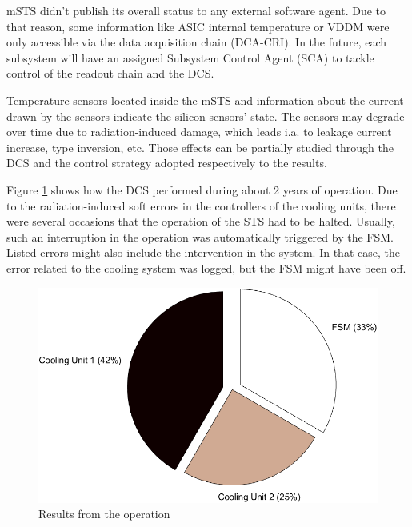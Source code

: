 \gls{mSTS} didn't publish its overall status to any external software agent. Due to that reason, some information like \gls{ASIC} internal temperature or VDDM were only accessible via the data acquisition chain (\gls{DCA}-\gls{CRI}). In the future, each subsystem will have an assigned Subsystem Control Agent (\gls{SCA}) to tackle control of the readout chain and the \gls{DCS}. 


Temperature sensors located inside the \gls{mSTS} and information about the current drawn by the sensors indicate the silicon sensors' state. The sensors may degrade over time due to radiation-induced damage,  which leads i.a. to leakage current increase, type inversion, etc. Those effects can be partially studied through the \gls{DCS} and the control strategy adopted respectively to the results.

Figure \ref{fig_dcs_results} shows how the \gls{DCS} performed during about 2 years of operation. Due to the radiation-induced soft errors in the controllers of the cooling units, there were several occasions that the operation of the \gls{STS} had to be halted. Usually, such an interruption in the operation was automatically triggered by the \gls{FSM}. Listed errors might also include the intervention in the system. In that case, the error related to the cooling system was logged, but the FSM might have been off.
\begin{figure}[!h]
\centering
\includegraphics[width=0.55\columnwidth]{Chapter6/DCS/images/DCSpie.png}
\caption{Results from the operation}
\label{fig_dcs_results}
\end{figure}


